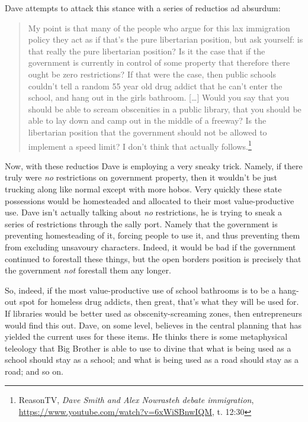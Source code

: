 \documentclass[11pt]{article}
\begin{document}
Dave attempts to attack this stance with a series of reductios ad absurdum:
\begin{quote}
My point is that many of the people who argue for this lax immigration policy they act as if that's the pure libertarian position, but ask yourself: is that really the pure libertarian position? Is it the case that if the government is currently in control of some property that therefore there ought be zero restrictions? If that were the case, then public schools couldn't tell a random 55 year old drug addict that he can't enter the school, and hang out in the girls bathroom. [\ldots{}] Would you say that you should be able to scream obscenities in a public library, that you should be able to lay down and camp out in the middle of a freeway? Is the libertarian position that the government should not be allowed to implement a speed limit? I don't think that actually follows.\footnote{ReasonTV, \emph{Dave Smith and Alex Nowrasteh debate immigration}, \url{https://www.youtube.com/watch?v=6xWiSBnwIQM}, t. 12:30}
\end{quote}

Now, with these reductios Dave is employing a very sneaky trick. Namely, if there truly were \emph{no} restrictions on government property, then it wouldn't be just trucking along like normal except with more hobos. Very quickly these state possessions would be homesteaded and allocated to their most value-productive use. Dave isn't actually talking about \emph{no} restrictions, he is trying to sneak a series of restrictions through the sally port. Namely that the government is preventing homesteading of it, forcing people to use it, and thus preventing them from excluding unsavoury characters. Indeed, it would be bad if the government continued to forestall these things, but the open borders position is precisely that the government \emph{not} forestall them any longer.

So, indeed, if the most value-productive use of school bathrooms is to be a hang-out spot for homeless drug addicts, then great, that's what they will be used for. If libraries would be better used as obscenity-screaming zones, then entrepreneurs would find this out. Dave, on some level, believes in the central planning that has yielded the current uses for these items. He thinks there is some metaphysical teleology that Big Brother is able to use to divine that what is being used as a school should stay as a school; and what is being used as a road should stay as a road; and so on.
\end{document}
